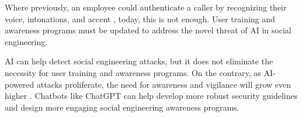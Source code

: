 Where previously, an employee could authenticate a caller by recognizing their voice, intonations, and accent \citep{mitnick_The_Art_of_Deception_2003}, today, this is not enough. User training and awareness programs must be updated to address the novel threat of AI in social engineering.


    
AI can help detect social engineering attacks, but it does not eliminate the necessity for user training and awareness programs. On the contrary, as AI-powered attacks proliferate, the need for awareness and vigilance will grow even higher \citep{fakhouri_AI_Driven_Solutions_SE_Attacks_2024}. Chatbots like ChatGPT can help develop more robust security guidelines and design more engaging social engineering awareness programs.




